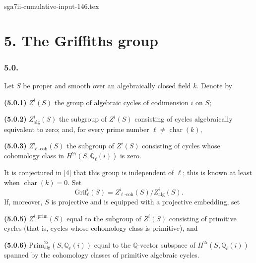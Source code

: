 \begin{filecontents*}{sga7ii-cumulative-input-146.tex}
\section*{5. The Griffiths group}

\subsubsection*{5.0.}
Let $S$ be proper and smooth over an algebraically closed field $k$.
Denote by

\medskip
\noindent\textbf{(5.0.1)} $Z^i(S)$ the group of algebraic cycles of
codimension $i$ on $S$;

\noindent\textbf{(5.0.2)} $Z^i_{\mathrm{alg}}(S)$ the subgroup of
$Z^i(S)$ consisting of cycles algebraically equivalent to zero; and, for
every prime number $\ell\ne\operatorname{char}(k)$,

\noindent\textbf{(5.0.3)} $Z^i_{\ell\text{-}\mathrm{coh}}(S)$ the subgroup
of $Z^i(S)$ consisting of cycles whose cohomology class in
$H^{2i}(S,\mathbb Q_\ell(i))$ is zero.

It is conjectured in \textup{[4]} that this group is independent of $\ell$;
this is known at least when $\operatorname{char}(k)=0$.  Set
\begin{equation}\tag{5.0.4}
\mathrm{Grif}^i_\ell(S)
 =Z^i_{\ell\text{-}\mathrm{coh}}(S)/Z^i_{\mathrm{alg}}(S).
\end{equation}
If, moreover, $S$ is projective and is equipped with a projective embedding,
set

\medskip
\noindent\textbf{(5.0.5)} $Z^{i,\mathrm{prim}}(S)$ equal to the subgroup
of $Z^i(S)$ consisting of primitive cycles (that is, cycles whose
cohomology class is primitive), and

\noindent\textbf{(5.0.6)}
$\mathrm{Prim}^{2i}_{\mathrm{alg}}(S,\mathbb Q_\ell(i))$ equal to the
$\mathbb Q$-vector subspace of $H^{2i}(S,\mathbb Q_\ell(i))$ spanned by
the cohomology classes of primitive algebraic cycles.


\end{filecontents*}
